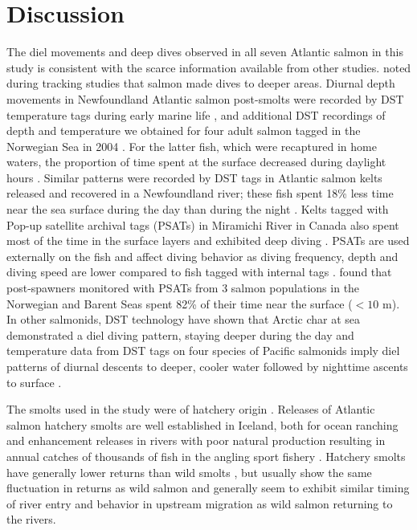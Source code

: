 \section{Discussion}
\label{Dis}
The diel movements and deep dives observed in all seven Atlantic salmon in this study is consistent with the scarce information available from other studies. 
\cite{Westerberg1982a} noted during tracking studies that salmon made dives to deeper areas. 
Diurnal depth movements in Newfoundland Atlantic salmon post-smolts were recorded by DST temperature tags during early marine life \citep{Reddin2006}, and additional DST recordings of depth and temperature we obtained for four adult salmon tagged in the Norwegian Sea in 2004 \citep{Holm2006}. 
For the latter fish, which were recaptured in home waters, the proportion of time spent at the surface decreased during daylight hours \citep{Holm2006}. 
Similar patterns were recorded by DST tags in Atlantic salmon kelts released and recovered in a Newfoundland river; these fish spent 18\% less time near the sea surface during the day than during the night \citep{Reddin2011}. 
Kelts tagged with Pop-up satellite archival tags (PSATs) in Miramichi River in Canada also spent most of the time in the surface layers and exhibited deep diving \citep{Strom2017}. 
PSATs are used externally on the fish and affect diving behavior as diving frequency, depth and diving speed are lower compared to fish tagged with internal tags \citep{Hedger2016}. 
\citet{Hedger2017} found that post-spawners monitored with PSATs from 3 salmon populations in the Norwegian and Barent Seas spent 82\% of their time near the surface ($<10$ m).
In other salmonids, DST technology have shown that Arctic char at sea demonstrated a diel diving pattern, staying deeper during the day \citep{Rikardsen2007} and temperature data from DST tags on four species of Pacific salmonids imply diel patterns of diurnal descents to deeper, cooler water followed by nighttime ascents to surface \citep{Walker2000}.

The smolts used in the study were of hatchery origin \citep{Gudjonsson2015}. 
Releases of Atlantic salmon hatchery smolts are well established in Iceland, both for ocean ranching and enhancement releases in rivers with poor natural production resulting in annual catches of thousands of fish in the angling sport fishery \citep{Thordardottir2017}.   
Hatchery smolts have generally lower returns than wild smolts \citep{ICES2018}, but usually show the same fluctuation in returns as wild salmon \citep{Johannsson1996} and generally seem to exhibit similar timing of river entry and behavior in upstream migration as wild salmon returning to the rivers.

